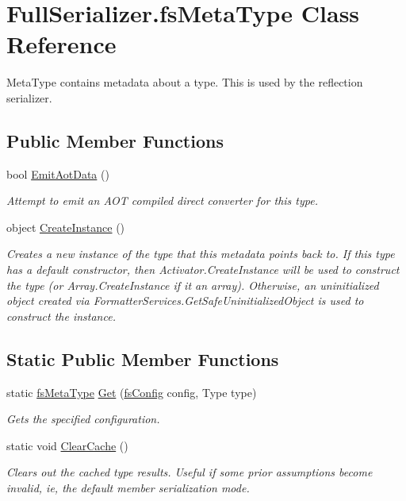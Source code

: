 \hypertarget{class_full_serializer_1_1fs_meta_type}{}\section{Full\+Serializer.\+fs\+Meta\+Type Class Reference}
\label{class_full_serializer_1_1fs_meta_type}


Meta\+Type contains metadata about a type. This is used by the reflection serializer.  


\subsection*{Public Member Functions}
\begin{DoxyCompactItemize}
\item 
bool \hyperlink{class_full_serializer_1_1fs_meta_type_a519eb6ef7c8ffe3b955a979007a1214c}{Emit\+Aot\+Data} ()
\begin{DoxyCompactList}\small\item\em Attempt to emit an A\+OT compiled direct converter for this type. \end{DoxyCompactList}\item 
object \hyperlink{class_full_serializer_1_1fs_meta_type_a2c5ea6c69f0e1bb29c6c4c11317926b5}{Create\+Instance} ()
\begin{DoxyCompactList}\small\item\em Creates a new instance of the type that this metadata points back to. If this type has a default constructor, then Activator.\+Create\+Instance will be used to construct the type (or Array.\+Create\+Instance if it an array). Otherwise, an uninitialized object created via Formatter\+Services.\+Get\+Safe\+Uninitialized\+Object is used to construct the instance. \end{DoxyCompactList}\end{DoxyCompactItemize}
\subsection*{Static Public Member Functions}
\begin{DoxyCompactItemize}
\item 
static \hyperlink{class_full_serializer_1_1fs_meta_type}{fs\+Meta\+Type} \hyperlink{class_full_serializer_1_1fs_meta_type_a7958d481341e70175aae107ea82e329e}{Get} (\hyperlink{class_full_serializer_1_1fs_config}{fs\+Config} config, Type type)
\begin{DoxyCompactList}\small\item\em Gets the specified configuration. \end{DoxyCompactList}\item 
static void \hyperlink{class_full_serializer_1_1fs_meta_type_af2c4148ca9a3f9fe8d898e20035465b8}{Clear\+Cache} ()
\begin{DoxyCompactList}\small\item\em Clears out the cached type results. Useful if some prior assumptions become invalid, ie, the default member serialization mode. \end{DoxyCompactList}\end{DoxyCompactItemize}
